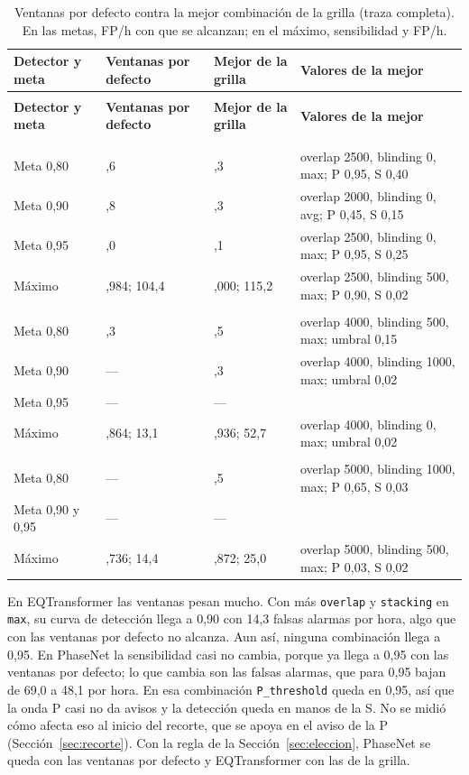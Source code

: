 \documentclass[11pt,a4paper,oneside,spanish,oldfontcommands]{memoir}
\newcommand{\cabecera}[2]{%
  \toprule #1 \\ \midrule \endfirsthead
  \multicolumn{#2}{l}{\itshape Cuadro \thetable{} (continuación)}\\
  \toprule #1 \\ \midrule \endhead
  \midrule \multicolumn{#2}{r}{\itshape Continúa en la página siguiente}\\ \endfoot
  \bottomrule \endlastfoot}
\begin{document}
{\small
\setlength{\tabcolsep}{4pt}
\begin{longtable}{>{\raggedright\arraybackslash}p{3.6cm}>{\raggedright\arraybackslash}p{2.8cm}>{\raggedright\arraybackslash}p{2.8cm}>{\raggedright\arraybackslash}p{5.0cm}}
\caption{Ventanas por defecto contra la mejor combinación de la grilla (traza completa). En las metas, FP/h con que se alcanzan; en el máximo, sensibilidad y FP/h.}\label{tab:grilla}\\
\cabecera{\textbf{Detector y meta} & \textbf{Ventanas por defecto} & \textbf{Mejor de la grilla} & \textbf{Valores de la mejor}}{4}
\multicolumn{4}{l}{\textit{PhaseNet, P y S}}\\*
\addlinespace
Meta 0,80 & 28,6 & 25,3 & overlap 2500, blinding 0, max; P 0,95, S 0,40 \\
Meta 0,90 & 41,8 & 39,3 & overlap 2000, blinding 0, avg; P 0,45, S 0,15 \\
Meta 0,95 & 69,0 & 48,1 & overlap 2500, blinding 0, max; P 0,95, S 0,25 \\
Máximo & 0,984; 104,4 & 1,000; 115,2 & overlap 2500, blinding 500, max; P 0,90, S 0,02 \\
\midrule
\multicolumn{4}{l}{\textit{EQTransformer, detección}}\\*
\addlinespace
Meta 0,80 & 10,3 & 8,5 & overlap 4000, blinding 500, max; umbral 0,15 \\
Meta 0,90 & --- & 14,3 & overlap 4000, blinding 1000, max; umbral 0,02 \\
Meta 0,95 & --- & --- & \\
Máximo & 0,864; 13,1 & 0,936; 52,7 & overlap 4000, blinding 0, max; umbral 0,02 \\
\midrule
\multicolumn{4}{l}{\textit{EQTransformer, P y S}}\\*
\addlinespace
Meta 0,80 & --- & 12,5 & overlap 5000, blinding 1000, max; P 0,65, S 0,03 \\
Meta 0,90 y 0,95 & --- & --- & \\
Máximo & 0,736; 14,4 & 0,872; 25,0 & overlap 5000, blinding 500, max; P 0,03, S 0,02 \\
\end{longtable}
}

En EQTransformer las ventanas pesan mucho. Con más \texttt{overlap} y
\texttt{stacking} en \texttt{max}, su curva de detección llega a 0,90 con 14,3
falsas alarmas por hora, algo que con las ventanas por defecto no alcanza. Aun
así, ninguna combinación llega a 0,95. En PhaseNet la sensibilidad casi no
cambia, porque ya llega a 0,95 con las ventanas por defecto; lo que cambia son las falsas alarmas, que para 0,95 bajan de 69,0 a 48,1 por hora. En esa combinación
\texttt{P\_threshold} queda en 0,95, así que la onda P casi no da avisos y la
detección queda en manos de la S. No se midió cómo afecta eso al inicio del
recorte, que se apoya en el aviso de la P (Sección~\ref{sec:recorte}). Con la
regla de la Sección~\ref{sec:eleccion}, PhaseNet se queda con las ventanas por
defecto y EQTransformer con las de la grilla.
\end{document}
